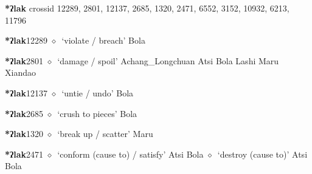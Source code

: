 \item
\textbf{*ʔlak}
  {\tiny crossid 12289, 2801, 12137, 2685, 1320, 2471, 6552, 3152, 10932, 6213, 11796}
  \begin{list}{}{\leftmargin=1.5em \itemindent=-1.5em}
  \item {\footnotesize \textbf{*ʔlak}}{\tiny 12289}
         $\diamond$~`violate / breach'
         Bola 
  \item {\footnotesize \textbf{*ʔlak}}{\tiny 2801}
\hspace{1ex}
         $\diamond$~`damage / spoil'
         Achang\_Longchuan 
\hspace{1ex}
         Atsi 
\hspace{1ex}
         Bola 
\hspace{1ex}
         Lashi 
\hspace{1ex}
         Maru 
\hspace{1ex}
         Xiandao 
  \item {\footnotesize \textbf{*ʔlak}}{\tiny 12137}
\hspace{1ex}
         $\diamond$~`untie / undo'
         Bola 
  \item {\footnotesize \textbf{*ʔlak}}{\tiny 2685}
\hspace{1ex}
         $\diamond$~`crush to pieces'
         Bola 
  \item {\footnotesize \textbf{*ʔlak}}{\tiny 1320}
\hspace{1ex}
         $\diamond$~`break up / scatter'
         Maru 
  \item {\footnotesize \textbf{*ʔlak}}{\tiny 2471}
\hspace{1ex}
         $\diamond$~`conform (cause to) / satisfy'
         Atsi 
\hspace{1ex}
         Bola 
\hspace{1ex}
         $\diamond$~`destroy (cause to)'
         Atsi 
\hspace{1ex}
         Bola 
\hspace{1ex}

\end{list}
